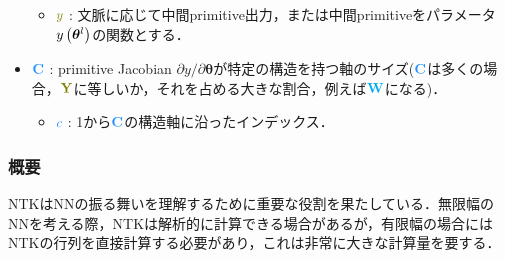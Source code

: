 \begin{itemize}
\begin{itemize}
        \item $\olive{y}$ : 文脈に応じて中間primitive出力，または中間primitiveをパラメータ$y\left(\bm{\theta}^l\right)$の関数とする．
    \end{itemize}
    \item $\dblue{\bmrm{C}}$ : primitive Jacobian $\partial y / \partial\bm{\theta}$が特定の構造を持つ軸のサイズ($\dblue{\bmrm{C}}$は多くの場合，$\olive{\bmrm{Y}}$に等しいか，それを占める大きな割合，例えば$\textcolor{cyan}{\bm{\mathrm{W}}}$になる)．
    \begin{itemize}
        \item $\dblue{c}$ : 1から$\dblue{\bmrm{C}}$の構造軸に沿ったインデックス．
    \end{itemize}
\end{itemize}

\subsubsection{概要}
NTKはNNの振る舞いを理解するために重要な役割を果たしている．無限幅のNNを考える際，NTKは解析的に計算できる場合があるが，有限幅の場合にはNTKの行列を直接計算する必要があり，これは非常に大きな計算量を要する．
